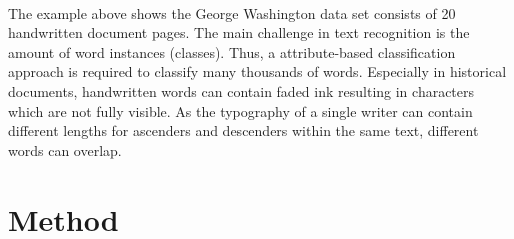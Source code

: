 \documentclass[a0,portrait]{a0poster}
\providecommand{\postersection}[1]{
\color{tucol2}
\section*{\sf \huge #1}\Large\sf
\color{Black}
}
\begin{document}
\begin{multicols}{2}
\vspace{-1cm}
\\
The example above shows the George Washington data set consists of 20 
handwritten document pages. The main challenge in text recognition is 
the amount of word instances (classes). Thus, a attribute-based classification 
approach is required to classify many thousands of words. Especially in historical documents, 
handwritten words can contain faded ink resulting in characters which are not 
fully visible. As the typography of a single writer can contain different lengths for
ascenders and descenders within the same text, different words can overlap.

\end{multicols}

\vspace{-2.5cm}
\postersection{Method}

\vspace*{-30mm}
\end{document}
